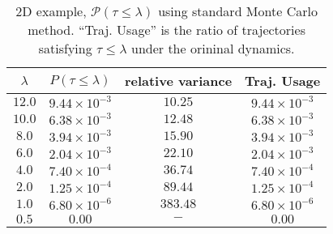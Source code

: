 \documentclass[final]{siamltex}
\begin{document}
\begin{table}[htbp]
  \begin{tabular*}{0.9\textwidth}{@{\extracolsep{\fill}}cccc}
    \hline
    \hline
    $\lambda$ & $P(\tau \le \lambda)$ & relative variance & Traj. Usage  \\
    \hline
    $12.0$  & $9.44\times 10^{-3}$ & $10.25$ & $9.44\times 10^{-3}$  \\
    $10.0$  & $6.38\times 10^{-3}$ & $12.48$ & $6.38\times 10^{-3}$  \\
    $8.0$  & $3.94\times 10^{-3}$ & $15.90$ & $3.94\times 10^{-3}$  \\
  $6.0$  & $2.04\times 10^{-3}$ & $22.10$ & $2.04\times 10^{-3}$  \\
  $4.0$  & $7.40\times 10^{-4}$ & $36.74$ & $7.40\times 10^{-4}$  \\
  $2.0$  & $1.25\times 10^{-4}$ & $89.44$ & $1.25\times 10^{-4}$  \\
  $1.0$  & $6.80\times 10^{-6}$ & $383.48$ & $6.80\times 10^{-6}$  \\
  $0.5$  & $0.00$ & $-$ & $0.00$ \\
    \hline
    \hline
  \end{tabular*}
  \centering
  \caption{2D example, $\mathcal{P}(\tau \le \lambda)$ using standard Monte
  Carlo method. ``Traj. Usage'' is the ratio of trajectories satisfying $\tau \le \lambda$
under the orininal dynamics. \label{tab-ex2-5}}
\end{table}
\begin{comment}
\begin{figure}[tphb]
  \centering
    \texttt{[image: ./fig/pdf\_tau\_2d.eps]} \caption{2D example,
    cumulative distribution function of $\tau$, computed using importance
  sampling with basis $\{\phi_0, \phi_1, \phi_2, \phi_3\}$.\label{fig-ex2-2}}
\end{figure}
\begin{figure}[tphb]
  \centering
  \begin{tabular}{ll}
    \subfigure[$\lambda=12.0$]{\texttt{[image: ./fig/pot\_2d\_2\_2\_7.eps]}} 
    &
    \subfigure[$\lambda=6.0$]{\texttt{[image: ./fig/pot\_2d\_2\_11\_7.eps]}} \\
    \subfigure[$\lambda=2.0$]{\texttt{[image: ./fig/pot\_2d\_2\_17\_7.eps]}}
    &
    \subfigure[$\lambda=0.5$]{\texttt{[image: ./fig/pot\_2d\_2\_23\_7.eps]}}
  \end{tabular}
  \caption{2D example, optimized potentials for computing $\mathcal{P}(\tau
  \le \lambda)$ with different $\lambda$. Basis functions $\{\phi_0,
\phi_1, \phi_2, \phi_3\}$ are used.\label{fig-ex2-3}}
\end{figure}
\end{comment}
\end{document}

